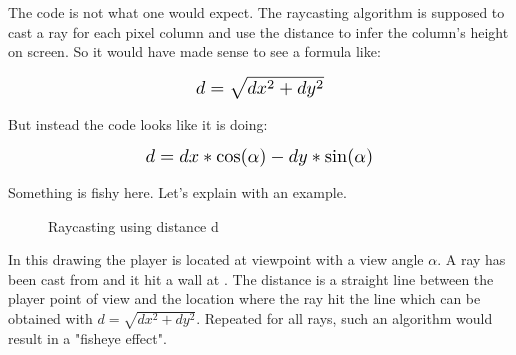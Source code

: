 The code is not what one would expect. The raycasting algorithm is supposed to cast a ray for each pixel column and use the distance  to infer the column's height on screen. So it would have made sense to see a formula like:
\begin{figure}[H]
  \centering
  \begin{equation*}
    \scalebox{1.3}{
$ d = \sqrt{dx^2 + dy^2}$ 
 }
  \end{equation*}
\end{figure}
But instead the code looks like it is doing: 
\begin{figure}[H]
  \centering
  \begin{equation*}
    \scalebox{1.3}{
$d = dx * \cos(\alpha) - dy * \sin(\alpha) $
 }
  \end{equation*}
\end{figure}
Something is fishy here. Let's explain with an example.\\
\par
\begin{figure}[H]
\centering
 
 \caption{Raycasting using distance d} \label{fig:Raycasting2}
\end{figure}

In this drawing the player is located at viewpoint with a view angle \begin{math}\alpha\end{math}. A ray has been cast from  and it hit a wall at . The distance  is a straight line between the player point of view and the location where the ray hit the line which can be obtained with $d = \sqrt{dx^2 + dy^2}$. Repeated for all rays, such an algorithm would result in a "fisheye effect".









